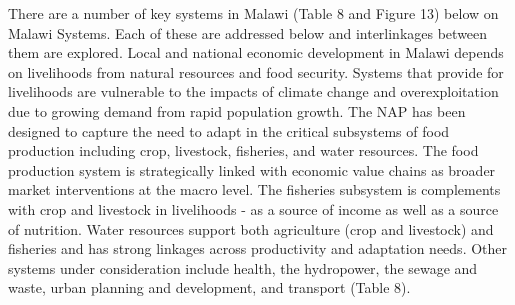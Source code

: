 \documentclass[
]{book}
\begin{document}
There are a number of key systems in Malawi (Table 8 and Figure 13) below on Malawi Systems. Each of these are addressed below and interlinkages between them are explored. Local and national economic development in Malawi depends on livelihoods from natural resources and food security. Systems that provide for livelihoods are vulnerable to the impacts of climate change and overexploitation due to growing demand from rapid population growth. The NAP has been designed to capture the need to adapt in the critical subsystems of food production including crop, livestock, fisheries, and water resources. The food production system is strategically linked with economic value chains as broader market interventions at the macro level. The fisheries subsystem is complements with crop and livestock in livelihoods - as a source of income as well as a source of nutrition. Water resources support both agriculture (crop and livestock) and fisheries and has strong linkages across productivity and adaptation needs. Other systems under consideration include health, the hydropower, the sewage and waste, urban planning and development, and transport (Table 8).

\providecommand{\docline}[3]{\noalign{\global\setlength{\arrayrulewidth}{#1}}\arrayrulecolor[HTML]{#2}\cline{#3}}

\setlength{\tabcolsep}{2pt}

\renewcommand*{\arraystretch}{1.5}
\end{document}
